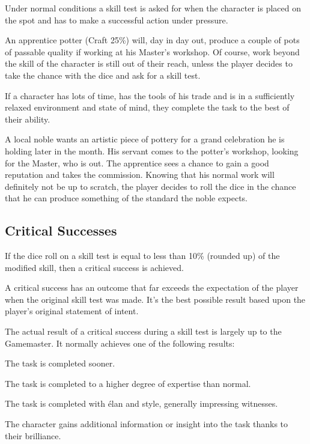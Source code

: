 Under normal conditions a skill test is asked for when the character is placed on the spot and has to make a successful action under pressure. 

\begin{rpg-examplebox}
An apprentice potter (Craft 25\%) will, day in day out, produce a couple of pots of passable quality if working at his Master’s workshop. Of course, work beyond the skill of the character is still out of their reach, unless the player decides to take the chance with the dice and ask for a skill test.
\end{rpg-examplebox}

If a character has lots of time, has the tools of his trade and is in a sufficiently relaxed environment and state of mind, they complete the task to the best of their ability. 

\begin{rpg-examplebox}
A local noble wants an artistic piece of pottery for a grand celebration he is holding later in the month. His servant comes to the potter’s workshop, looking for the Master, who is out. The apprentice sees a chance to gain a good reputation and takes the commission. Knowing that his normal work will definitely not be up to scratch, the player decides to roll the dice in the chance that he can produce something of the standard the noble expects.
\end{rpg-examplebox}

\subsection{Critical Successes}
If the dice roll on a skill test is equal to less than 10\% (rounded up) of the modified skill, then a critical success is achieved. 

A critical success has an outcome that far exceeds the expectation of the player when the original skill test was made. It’s the best possible result based upon the player’s original statement of intent.

The actual result of a critical success during a skill test is largely up to the Gamemaster. It normally achieves one of the following results: 

\begin{rpg-list}
\item The task is completed sooner. 
\item The task is completed to a higher degree of expertise than normal. 
\item The task is completed with élan and style, generally impressing witnesses. 
\item The character gains additional information or insight into the task thanks to their brilliance. 
\end{rpg-list}


